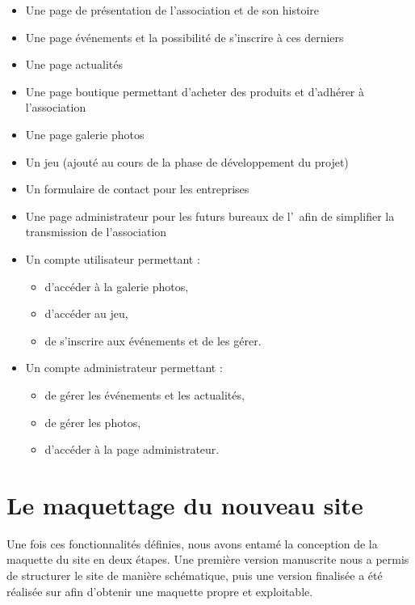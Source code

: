 \begin{itemize}
    \item Une page de présentation de l'association et de son histoire
    \item Une page événements et la possibilité de s'inscrire à ces derniers
    \item Une page actualités
    \item Une page boutique permettant d'acheter des produits et d'adhérer à l'association
    \item Une page galerie photos
    \item Un jeu (ajouté au cours de la phase de développement du projet)
    \item Un formulaire de contact pour les entreprises
    \item Une page administrateur pour les futurs bureaux de l'\ofni\ afin de simplifier la transmission de l'association
    \item Un compte utilisateur permettant :
    \begin{itemize}
        \item d'accéder à la galerie photos,
        \item d'accéder au jeu,
        \item de s'inscrire aux événements et de les gérer.
    \end{itemize}
    \item Un compte administrateur permettant :
    \begin{itemize}
        \item de gérer les événements et les actualités,
        \item de gérer les photos,
        \item d'accéder à la page administrateur.
    \end{itemize}
\end{itemize}

\section{Le maquettage du nouveau site}
\label{sec:maquettage}


Une fois ces fonctionnalités définies, nous avons entamé la conception de la maquette du site en deux étapes. Une première version manuscrite nous a permis de structurer le site de manière schématique, puis une version finalisée a été réalisée sur  afin d’obtenir une maquette propre et exploitable.

